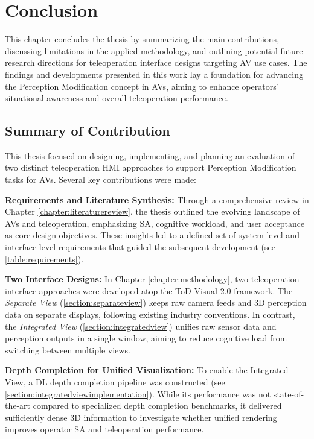 
\chapter{Conclusion}\label{chapter:conclusion}

This chapter concludes the thesis by summarizing the main contributions, discussing limitations in the applied methodology, and outlining potential future research directions for teleoperation interface designs targeting \ac{AV} use cases. The findings and developments presented in this work lay a foundation for advancing the Perception Modification concept in \acp{AV}, aiming to enhance operators' situational awareness and overall teleoperation performance.

\section{Summary of Contribution}
This thesis focused on designing, implementing, and planning an evaluation of two distinct teleoperation \ac{HMI} approaches to support Perception Modification tasks for \acp{AV}. Several key contributions were made:

    \textbf{Requirements and Literature Synthesis:} Through a comprehensive review in Chapter \ref{chapter:literaturereview}, the thesis outlined the evolving landscape of \acp{AV} and teleoperation, emphasizing \ac{SA}, cognitive workload, and user acceptance as core design objectives. These insights led to a defined set of system-level and interface-level requirements that guided the subsequent development (see \ref{table:requirements}).

    \textbf{Two Interface Designs:}
    In Chapter \ref{chapter:methodology}, two teleoperation interface approaches were developed atop the ToD Visual 2.0 framework. The \emph{Separate View} (\ref{section:separateview}) keeps raw camera feeds and 3D perception data on separate displays, following existing industry conventions. In contrast, the \emph{Integrated View} (\ref{section:integratedview}) unifies raw sensor data and perception outputs in a single window, aiming to reduce cognitive load from switching between multiple views.

    \textbf{Depth Completion for Unified Visualization:}  To enable the Integrated View, a \ac{DL} depth completion pipeline was constructed (see \ref{section:integratedviewimplementation}). While its performance was not state-of-the-art compared to specialized depth completion benchmarks, it delivered sufficiently dense 3D information to investigate whether unified rendering improves operator \ac{SA} and teleoperation performance.

